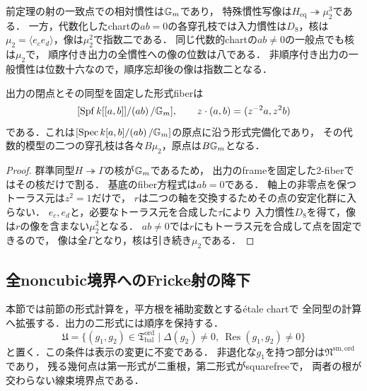 \begin{corollary}[特殊慣性と形式fiber]
\label{cor:qa-fricke-formal-boundary-fiber}
前定理の射の一致点での相対慣性は$\mathbb G_m$であり，
特殊慣性写像は$H_{\mathrm{eq}}\twoheadrightarrow\mu_2^3$である．
一方，代数化したchartの$ab=0$の各穿孔枝では入力慣性は$D_8$，核は
$\mu_2=\langle e_ce_d\rangle$，像は$\mu_2^2$で指数二である．
同じ代数的chartの$ab\ne0$の一般点でも核は$\mu_2$で，
順序付き出力の全慣性への像の位数は八である．
非順序付き出力の一般慣性は位数十六なので，順序忘却後の像は指数二となる．

出力の閉点とその同型を固定した形式fiberは
\[
 [\operatorname{Spf}k[[a,b]]/(ab)\,/\mathbb G_m],
 \qquad z\cdot(a,b)=(z^{-2}a,z^2b)
\]
である．これは$[\operatorname{Spec} k[a,b]/(ab)\,/\mathbb G_m]$の原点に沿う形式完備化であり，
その代数的模型の二つの穿孔枝は各々$B\mu_2$，原点は$B\mathbb G_m$となる．
\end{corollary}
\begin{proof}
群準同型$H\twoheadrightarrow\Gamma$の核が$\mathbb G_m$であるため，
出力のframeを固定した2-fiberではその核だけで割る．
基底のfiber方程式は$ab=0$である．
軸上の非零点を保つトーラス元は$z^2=1$だけで，
$r$は二つの軸を交換するためその点の安定化群に入らない．
$e_c,e_d$と，必要なトーラス元を合成した$\tau$により
入力慣性$D_8$を得て，像は$r$の像を含まない$\mu_2^2$となる．
$ab\ne0$では$r$にもトーラス元を合成して点を固定できるので，
像は全$\Gamma$となり，核は引き続き$\mu_2$である．
\end{proof}


\subsection{全noncubic境界へのFricke射の降下}

本節では前節の形式計算を，平方根を補助変数とする\'etale chartで
全同型の計算へ拡張する．出力の二形式には順序を保持する．
\[
 \mathfrak U=
 \{(g_1,g_2)\in\mathfrak T_{\mathrm{bal}}^{\mathrm{ord}}
       \mid \Delta(g_2)\ne0,\ \operatorname{Res}(g_1,g_2)\ne0\}
\]
と置く．この条件は表示の変更に不変である．
非退化な$g_1$を持つ部分は$\mathfrak N^{\mathrm{sm,ord}}$であり，
残る幾何点は第一形式が二重根，第二形式がsquarefreeで，
両者の根が交わらない線束境界点である．

